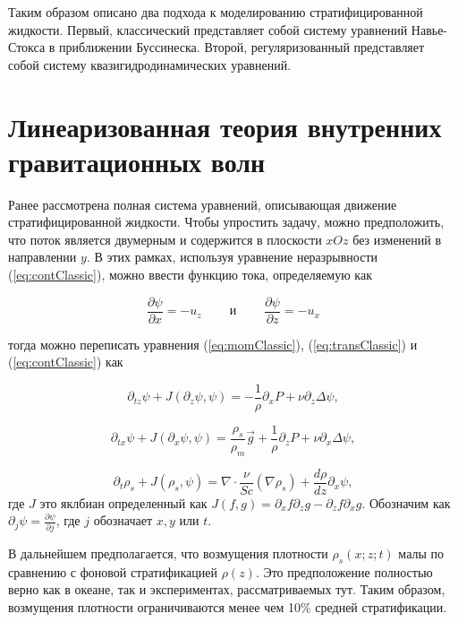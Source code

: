 Таким образом описано два подхода к моделированию стратифицированной жидкости. Первый, классический представляет собой систему уравнений Навье-Стокса в приближении Буссинеска. Второй, регуляризованный представляет собой систему квазигидродинамических уравнений. 

\section{Линеаризованная теория внутренних гравитационных волн}

Ранее рассмотрена полная система уравнений, описывающая движение стратифицированной жидкости. Чтобы упростить задачу, можно предположить, что поток является двумерным и содержится в плоскости $xOz$ без изменений в направлении $y$. В этих рамках, используя уравнение неразрывности (\ref{eq:contClassic}), можно ввести функцию тока, определяемую как

\begin{equation}
    \frac{\partial \psi}{\partial x} = - u_z \;\;\;\;\;\;\;\; и \;\;\;\;\;\;\;\; \frac{\partial \psi}{\partial z} = - u_x
\end{equation}

тогда можно переписать уравнения (\ref{eq:momClassic}), (\ref{eq:transClassic}) и (\ref{eq:contClassic}) как

\begin{equation}
    \partial_{tz} \psi + J(\partial_z \psi, \psi) = - \frac{1}{\rho} \partial_x P + \nu \partial_z \Delta \psi,
    \label{eq:tokz}
\end{equation}

\begin{equation}
    \partial_{tx} \psi + J(\partial_x \psi, \psi) = \frac{\rho_s}{\rho_m}\vec{g}+\frac{1}{\rho}\partial_z P + \nu \partial_x \Delta \psi,
    \label{eq:tokx}
\end{equation}

\begin{equation}
    \partial_t \rho_s + J(\rho_s,\psi) = \nabla \cdot \frac{\nu}{Sc} (\nabla \rho_s) + \frac{d \rho}{dz} \partial_x \psi,
\end{equation}
где $J$ это яклбиан определенный как $J(f,g) = \partial_x f \partial_z g - \partial_z f \partial_x g.$ Обозначим как $\partial_j \psi =\frac{\partial \psi}{\partial j}$, где $j$ обозначает $x,y$ или $t$. 

В дальнейшем предполагается, что возмущения плотности $\rho_s(x; z; t)$ малы по сравнению с фоновой стратификацией $\rho(z)$. Это предположение полностью верно как в океане, так и экспериментах, рассматриваемых тут. Таким образом, возмущения плотности ограничиваются менее чем 10\% средней стратификации. 

